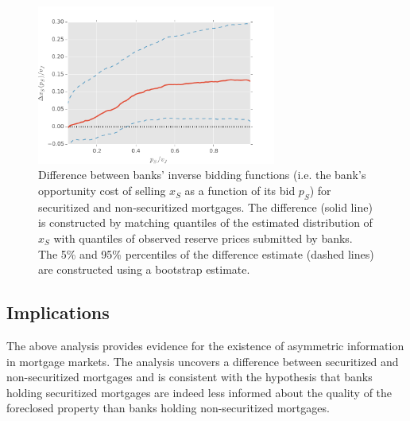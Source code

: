 \documentclass[11pt,twopage]{article}
\begin{document}
\begin{figure}[htp]
  \begin{center}
    \includegraphics[width=0.7\textwidth]{graphics/xs-diff-10-line}
    \caption{Difference between banks' inverse bidding functions
      (i.e. the bank's opportunity cost of selling $x_S$ as a function
      of its bid $p_S$) for securitized and non-securitized
      mortgages. The difference (solid line) is constructed by
      matching quantiles of the estimated distribution of $x_S$ with
      quantiles of observed reserve prices submitted by banks. The 5\%
      and 95\% percentiles of the difference estimate (dashed lines)
      are constructed using a bootstrap
      estimate.\label{fig:xs-diff-10}}
  \end{center}
\end{figure}

\subsection{Implications}

The above analysis provides evidence for the existence of asymmetric
information in mortgage markets. The analysis uncovers a difference
between securitized and non-securitized mortgages and is consistent
with the hypothesis that banks holding securitized mortgages are
indeed less informed about the quality of the foreclosed property than
banks holding non-securitized mortgages.
\end{document}
